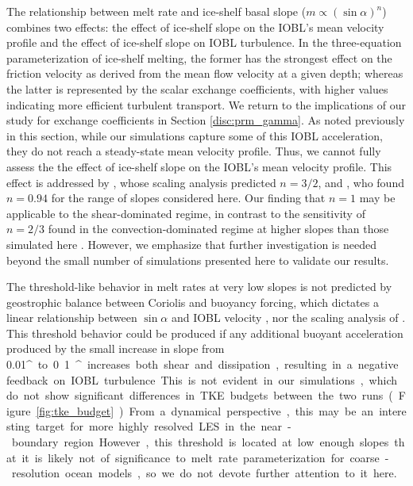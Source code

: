 \documentclass[tc, manuscript]{copernicus}
\begin{document}
The relationship between melt rate and ice-shelf basal slope ($m \propto (\sin\alpha)^{n}$) combines two effects: the effect of ice-shelf slope on the IOBL's mean velocity profile and the effect of ice-shelf slope on IOBL turbulence. In the three-equation parameterization of ice-shelf melting, the former has the strongest effect on the friction velocity as derived from the mean flow velocity at a given depth; whereas the latter is represented by the scalar exchange coefficients, with higher values indicating more efficient turbulent transport. We return to the implications of our study for exchange coefficients in Section \ref{disc:prm_gamma}. As noted previously in this section, while our simulations capture some of this IOBL acceleration, they do not reach a steady-state mean velocity profile. Thus, we cannot fully assess the the effect of ice-shelf slope on the IOBL's mean velocity profile. This effect is addressed by \citet{magorrian_turbulent_2016}, whose scaling analysis predicted $n=3/2$, and \citet{little_how_2009}, who found $n=0.94$ for the range of slopes considered here. Our finding that $n=1$ may be applicable to the shear-dominated regime, in contrast to the sensitivity of $n=2/3$ found in the convection-dominated regime at higher slopes than those simulated here \citep[5\unit{^{\circ}} -- 90\unit{^{\circ}};][]{mcconnochie_dissolution_2018, mondal_ablation_2019}. However, we emphasize that further investigation is needed beyond the small number of simulations presented here to validate our results. 

The threshold-like behavior in melt rates at very low slopes is not predicted by geostrophic balance between Coriolis and buoyancy forcing, which dictates a linear relationship between $\sin\alpha$ and IOBL velocity \citep{jenkins_simple_2016}, nor the scaling analysis of \citet{magorrian_turbulent_2016}. This threshold behavior could be produced if any additional buoyant acceleration produced by the small increase in slope from 0.01\unit{^{\circ}} to 0.1\unit{^{\circ}} increases both shear and dissipation, resulting in a negative feedback on IOBL turbulence. This is not evident in our simulations, which do not show significant differences in TKE budgets between the two runs (Figure \ref{fig:tke_budget}). From a dynamical perspective, this may be an interesting target for more highly resolved LES in the near-boundary region. However, this threshold is located at low enough slopes that it is likely not of significance to melt rate parameterization for coarse-resolution ocean models, so we do not devote further attention to it here. 
\end{document}
